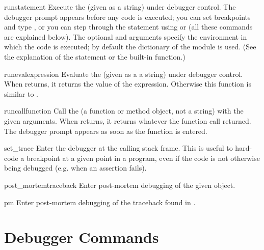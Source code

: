 \begin{funcdesc}{run}{statement}
Execute the  (given as a string) under debugger
control.  The debugger prompt appears before any code is executed; you
can set breakpoints and type , or you can step through
the statement using  or  (all these commands are
explained below).  The optional  and 
arguments specify the environment in which the code is executed; by
default the dictionary of the module  is used.  (See
the explanation of the  statement or the 
built-in function.)
\end{funcdesc}

\begin{funcdesc}{runeval}{expression}
Evaluate the  (given as a a string) under debugger
control.  When  returns, it returns the value of the
expression.  Otherwise this function is similar to
.
\end{funcdesc}

\begin{funcdesc}{runcall}{function}
Call the  (a function or method object, not a string)
with the given arguments.  When  returns, it returns
whatever the function call returned.  The debugger prompt appears as
soon as the function is entered.
\end{funcdesc}

\begin{funcdesc}{set_trace}{}
Enter the debugger at the calling stack frame.  This is useful to
hard-code a breakpoint at a given point in a program, even if the code
is not otherwise being debugged (e.g. when an assertion fails).
\end{funcdesc}

\begin{funcdesc}{post_mortem}{traceback}
Enter post-mortem debugging of the given  object.
\end{funcdesc}

\begin{funcdesc}{pm}{}
Enter post-mortem debugging of the traceback found in
.
\end{funcdesc}

\section{Debugger Commands}

